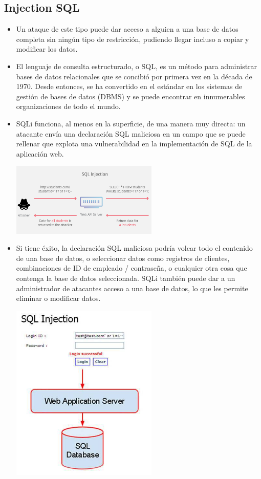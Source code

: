 \documentclass[%
 reprint,
 amsmath,amssymb,
 aps,
]{revtex4-1}
\begin{document}
\subsection{Injection SQL}
\begin{itemize}
\item Un ataque de este tipo puede dar acceso a alguien a una base de datos completa sin ningún tipo de
restricción, pudiendo llegar incluso a copiar y modificar los datos.
\item El lenguaje de consulta estructurado, o SQL, es un método para administrar bases de datos relacionales que se concibió por primera vez en la década de 1970. Desde entonces, se ha convertido en el estándar en los sistemas de gestión de bases de datos (DBMS) y se puede encontrar en innumerables organizaciones de todo el mundo.
\item SQLi funciona, al menos en la superficie, de una manera muy directa: un atacante envía una declaración SQL maliciosa en un campo que se puede rellenar que explota una vulnerabilidad en la implementación de SQL de la aplicación web.
\begin{center}
	\includegraphics[width=7cm]{./Imagenes/1}
\end{center}	
\item Si tiene éxito, la declaración SQL maliciosa podría volcar todo el contenido de una base de datos, o seleccionar datos como registros de clientes, combinaciones de ID de empleado / contraseña, o cualquier otra cosa que contenga la base de datos seleccionada. SQLi también puede dar a un administrador de atacantes acceso a una base de datos, lo que les permite eliminar o modificar datos.
\begin{center}
	\includegraphics[width=7cm]{./Imagenes/2}

\end{center}
\end{itemize}
\end{document}
